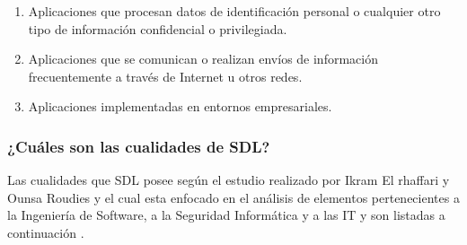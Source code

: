 \documentclass[runningheads,a4paper]{llncs}
\begin{document}
\begin{enumerate}
	\item Aplicaciones que procesan datos de identificación personal o cualquier otro  tipo de información confidencial o privilegiada. 
	\item Aplicaciones que se comunican o realizan envíos de información frecuentemente a través de Internet u otros redes. 
	\item Aplicaciones implementadas en entornos empresariales.
\end{enumerate}

\subsubsection{¿Cuáles son las cualidades de \gls{SDL}?}
Las cualidades que \gls{SDL} posee según el estudio realizado por Ikram El rhaffari y Ounsa Roudies y el cual esta enfocado en el análisis de elementos pertenecientes a la Ingeniería de \gls{Software}, a la Seguridad Informática y a las \gls{IT} y son listadas a continuación \cite{BenchmarkingSDLCLAPS}. 
\end{document}
